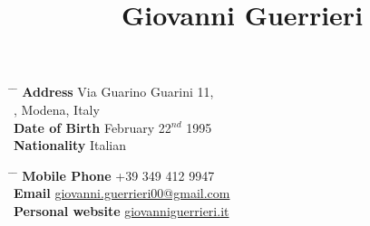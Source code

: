 \documentclass[10pt]{article} %
\begin{document}

\title{Giovanni Guerrieri} %


\parbox{0.5\textwidth}{ %
\begin{tabbing} %
\hspace{3cm} \= \hspace{4cm} \= \kill %
{\bf Address} \> Via Guarino Guarini 11, \\ %
, Modena, Italy \\ %
{\bf Date of Birth} \> February 22$^{nd}$ 1995 \\ %
{\bf Nationality} \> Italian %
\end{tabbing}}
\hfill %
\parbox{0.5\textwidth}{ %
\begin{tabbing} %
\hspace{3cm} \= \hspace{4cm} \= \kill %
{\bf Mobile Phone} \> +39 349 412 9947 \\ %
{\bf Email} \> \href{mailto:giovanni.guerrieri00@gmail.com}{giovanni.guerrieri00@gmail.com} \\ %
{\bf Personal website} \> \href{https://www.giovanniguerrieri.it/}{giovanniguerrieri.it}
\end{tabbing}}



\end{document}
